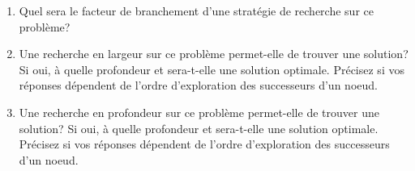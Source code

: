 \begin{td-exo}
\begin{enumerate}
		\item Quel sera le facteur de branchement d'une stratégie de recherche sur
		ce problème?

		\item Une recherche en largeur sur ce problème permet-elle de trouver une solution?
		Si oui, à quelle profondeur et sera-t-elle une solution optimale. Précisez si vos
		réponses dépendent de l'ordre d'exploration des successeurs d'un noeud.

		\item Une recherche en profondeur sur ce problème permet-elle de trouver une solution?
		Si oui, à quelle profondeur et sera-t-elle une solution optimale. Précisez si vos
		réponses dépendent de l'ordre d'exploration des successeurs d'un noeud.
	\end{enumerate}
\end{td-exo}

